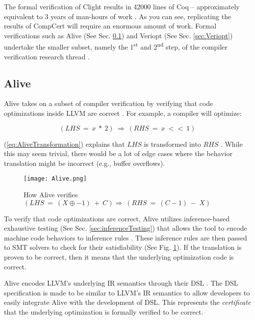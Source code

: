 The formal verification of Clight results in 42000 lines of Coq -- approximately equivalent to 3 years of man-hours 
of work \cite[Sec. 3.3]{compcertVerification}. As you can see, replicating the results of CompCert will require an enormous amount of work.
Formal verifications such as Alive (See Sec. \ref{sec:Alive}) and Veriopt (See Sec. \ref{sec:Veriopt}) undertake the smaller subset, 
namely the 1\textsuperscript{st} and 2\textsuperscript{nd} step, of the compiler verification research thread \cite{CompilerOptimization}.

\subsection{Alive}
\label{sec:Alive}

Alive takes on a subset of compiler verification by verifying that code optimizations inside LLVM are correct \cite{AliveInLean}. For example, 
a compiler will optimize:

\begin{equation}
    (LHS\ =\ x\ *\ 2)\ \Longrightarrow\ (RHS\ =\ x\ <<\ 1)
    \label{eq:AliveTransformation}
\end{equation}

(\ref{eq:AliveTransformation}) explains that \(LHS\) is transformed into \(RHS\) \cite[Sec. 2.1]{AliveInLean}.
While this may seem trivial, there would be a lot of edge cases where the behavior translation might be incorrect (e.g., buffer overflows).

\begin{figure}[ht]
    \centering
    \texttt{[image: Alive.png]}
    \caption{How Alive verifies \((LHS\ =\ (X \oplus -1)\ +\ C) \Longrightarrow \ (RHS\ =\ (C-1)\ -\ X)\) \cite[p. 1]{AliveInLean}}
    \label{fig:AliveSystem}
\end{figure}

To verify that code optimizations are correct, Alive utilizes inference-based exhaustive testing (See Sec. \ref{sec:inferenceTesting}) that allows 
the tool to encode machine code behaviors to inference rules \cite[Sec. 3.1.1]{AliveInLean}. These inference rules are then passed to SMT solvers 
to check for their satisfiability (See Fig. \ref{fig:AliveSystem}). If the translation is proven to be correct, then it means that the underlying 
optimization code is correct.

Alive encodes LLVM's \cite{llvm} underlying IR semantics through their DSL \cite[Fig. 1]{AliveInLean}. The DSL specification is made to be 
similar to LLVM's IR semantics to allow developers to easily integrate Alive with the development of DSL. This represents the 
\emph{certificate} that the underlying optimization is formally verified to be correct.

